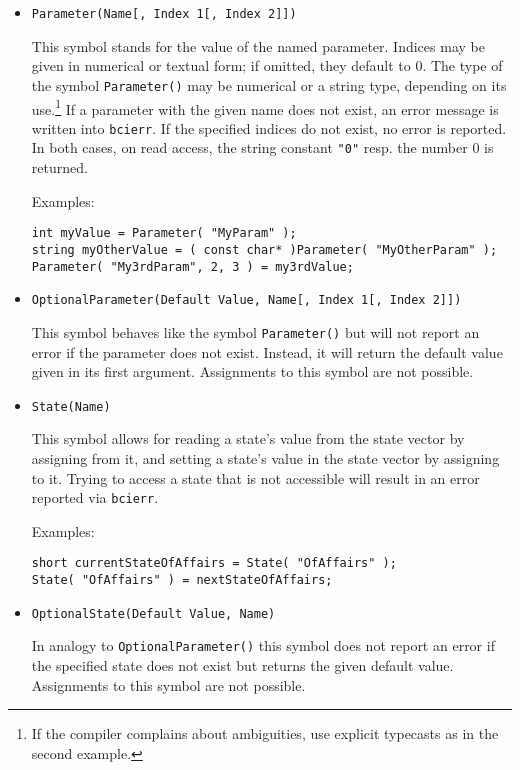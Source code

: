 \documentclass[12pt,letterpaper]{article}
\begin{document}
\begin{itemize}
\item {\texttt{Parameter(Name[, Index 1[, Index 2]])}}

This symbol stands for the value of the named parameter. 
Indices may be given in numerical or textual form; if omitted,
they default to 0.
The type of the symbol \texttt{Parameter()} may be numerical or
a string type, depending on its use.\footnote{If the compiler
complains about ambiguities, use explicit typecasts as in the
second example.}
If a parameter with the given name does not
exist, an error message is written into \texttt{bcierr}.
If the specified indices do not exist,
no error is reported. In both cases, on read access, the
string constant \texttt{"0"} resp. the number 0 is returned.

Examples:
\begin{verbatim}
int myValue = Parameter( "MyParam" );
string myOtherValue = ( const char* )Parameter( "MyOtherParam" );
Parameter( "My3rdParam", 2, 3 ) = my3rdValue; 
\end{verbatim}

\item \texttt{OptionalParameter(Default Value, Name[, Index 1[, Index 2]])}

This symbol behaves like the symbol \texttt{Parameter()} but will not report
an error if the parameter does not exist. Instead, it will return the
default value given in its first argument. Assignments to this symbol are
not possible.

\item \texttt{State(Name)}

This symbol allows for reading a state's value from the state vector by
assigning from it, and setting a state's value in the state vector by
assigning to it. Trying to access a state that is not accessible will
result in an error reported via \texttt{bcierr}.

Examples:
\begin{verbatim}
short currentStateOfAffairs = State( "OfAffairs" );
State( "OfAffairs" ) = nextStateOfAffairs;
\end{verbatim}

\item \texttt{OptionalState(Default Value, Name)}

In analogy to \texttt{OptionalParameter()} this symbol does not report
an error if the specified state does not exist but returns the given default
value. Assignments to this symbol are not possible.


\end{itemize}
\end{document}

